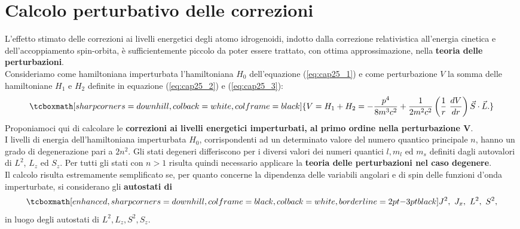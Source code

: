 \section{Calcolo perturbativo delle correzioni}
L'effetto stimato delle correzioni ai livelli energetici degli atomo idrogenoidi, indotto dalla correzione relativistica all'energia cinetica e dell'accoppiamento spin-orbita, è sufficientemente piccolo da poter essere trattato, con ottima approssimazione, nella \textbf{teoria delle perturbazioni}. \\

Consideriamo come hamiltoniana imperturbata l'hamiltoniana $H_0$ dell'equazione (\ref{eq:cap25_1}) e come perturbazione $V$ la somma delle hamiltoniane $H_1$ e $H_2$ definite in equazione (\ref{eq:cap25_2}) e (\ref{eq:cap25_3}):
	\begin{equation} 
		\tcboxmath[sharp corners=downhill, colback=white, colframe=black]{
			V=H_1+H_2=-\frac{p^4}{8m^3c^2}+\frac{1}{2m^2c^2} \left( \frac{1}{r} \ \frac{dV}{dr} \right) \vec{S} \cdot \vec{L} .
			}
	\end{equation}
Proponiamoci qui di calcolare le \textbf{correzioni ai livelli energetici imperturbati, al primo ordine nella perturbazione $\boldsymbol{V}$}. \\

I livelli di energia dell'hamiltoniana imperturbata $H_0$, corrispondenti ad un determinato valore del numero quantico principale $n$, hanno un grado di degenerazione pari a $2n^2$. Gli stati degeneri differiscono per i diversi valori dei numeri quantici $l,m_l$ ed $m_s$ definiti dagli autovalori di $L^2$, $L_z$ ed $S_z$. Per tutti gli stati con $n>1$ risulta quindi necessario applicare la \textbf{teoria delle perturbazioni nel caso degenere}. \\

Il calcolo risulta estremamente semplificato se, per quanto concerne la dipendenza delle variabili angolari e di spin delle funzioni d'onda imperturbate, si considerano gli \textbf{autostati di}
	\begin{equation}
	\label{eq:cap25_4}
		\tcboxmath[enhanced, sharp corners=downhill, colframe=black, colback=white, borderline={2pt}{-3pt}{black}]{
			J^2, \ J_x, \ L^2, \ S^2 ,
			}
	\end{equation}
in luogo degli autostati di $L^2, L_z, S^2, S_z$. \\

